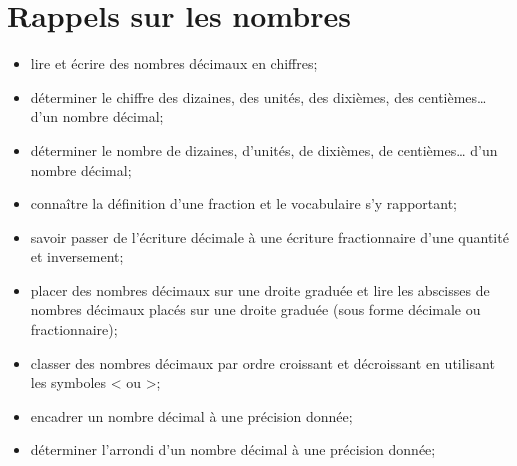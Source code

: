 \chapter{Rappels sur les nombres}\label{ChNbEntiersDecimaux}

\begin{acquis}
\begin{itemize}
\item lire et écrire des nombres décimaux en chiffres;
\item déterminer le chiffre des dizaines, des unités, des dixièmes, des centièmes… d'un nombre décimal;
\item déterminer le nombre de dizaines, d’unités, de dixièmes, de centièmes… d'un nombre décimal;
\item connaître la définition d'une fraction et le vocabulaire s'y rapportant;
\item savoir passer de l'écriture décimale à une écriture fractionnaire d'une quantité et inversement;
\item placer des nombres décimaux sur une droite graduée et lire les abscisses de nombres décimaux placés sur une droite graduée (sous forme décimale ou fractionnaire);
\item classer des nombres décimaux par ordre croissant et décroissant en utilisant les symboles < ou >;
\item encadrer un nombre décimal à une précision donnée;
\item déterminer l'arrondi d'un nombre décimal à une précision donnée;
\end{itemize}
\end{acquis}

\cours


\exercicesbase
\begin{colonne*exercice}

\end{colonne*exercice}


\exercicesappr
\begin{colonne*exercice}

\end{colonne*exercice}




